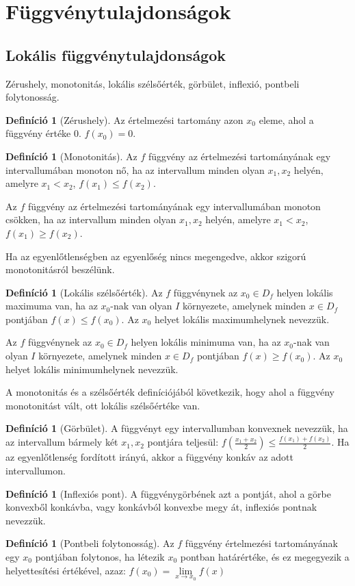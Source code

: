\documentclass[twoside,12pt]{report}
\theoremstyle{definition}
\newtheorem{definition}[theorem]{Definíció}
\begin{document}
\section{Függvénytulajdonságok}
	\subsection{Lokális függvénytulajdonságok}
	Zérushely, monotonitás, lokális szélsőérték, görbület, inflexió, pontbeli folytonosság.
	\begin{definition}[Zérushely]
		Az értelmezési tartomány azon $x_0$ eleme, ahol a függvény értéke 0. $f(x_0)=0$.
	\end{definition}
	\begin{definition}[Monotonitás]
		Az $f$ függvény az értelmezési tartományának egy intervallumában monoton nő, ha az intervallum minden olyan $x_1, x_2$ helyén, amelyre $x_1<x_2$, $f(x_1)\le f(x_2)$.
		
		Az $f$ függvény az értelmezési tartományának egy intervallumában monoton csökken, ha az intervallum minden olyan $x_1, x_2$ helyén, amelyre $x_1<x_2$, $f(x_1)\ge f(x_2)$.
		
		Ha az egyenlőtlenségben az egyenlőség nincs megengedve, akkor szigorú monotonitásról
		beszélünk.
	\end{definition}
	\begin{definition}[Lokális szélsőérték]
		Az $f$ függvénynek az $x_0\in D_f$ helyen lokális maximuma van, ha az $x_0$-nak van olyan $I$ környezete, amelynek minden $x\in D_f$ pontjában $f(x)\le f(x_0)$. Az $x_0$ helyet lokális maximumhelynek nevezzük.
		
		Az $f$ függvénynek az $x_0\in D_f$ helyen lokális minimuma van, ha az $x_0$-nak van olyan $I$ környezete, amelynek minden $x\in D_f$ pontjában $f(x)\ge f(x_0)$. Az $x_0$ helyet lokális minimumhelynek nevezzük.
	\end{definition}
	A monotonitás és a szélsőérték definíciójából következik, hogy ahol a függvény monotonitást
	vált, ott lokális szélsőértéke van.
	\begin{definition}[Görbület]
		A függvényt egy intervallumban konvexnek nevezzük, ha az intervallum bármely két $x_1,x_2$ pontjára teljesül: $f\left(\frac{x_1+x_2}{2}\right)\le\frac{f(x_1)+f(x_2)}{2}$. Ha az egyenlőtlenség fordított irányú, akkor a függvény konkáv az adott intervallumon.
	\end{definition}
	\begin{definition}[Inflexiós pont]
		A függvénygörbének azt a pontját, ahol a görbe konvexből konkávba, vagy
		konkávból konvexbe megy át, inflexiós pontnak nevezzük.
	\end{definition}
	\begin{definition}[Pontbeli folytonosság]
		Az $f$ függvény értelmezési tartományának egy $x_0$ pontjában folytonos, ha létezik $x_0$ pontban határértéke, és ez megegyezik a helyettesítési értékével, azaz: $f(x_0)=\lim\limits_{x\to x_0}f(x)$
	\end{definition}
\end{document}
